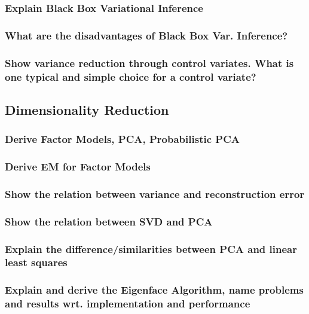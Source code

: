 \documentclass{article}
\begin{document}
\subsubsection{Explain Black Box Variational Inference}

\subsubsection{What are the disadvantages of Black Box Var. Inference?}

\subsubsection{Show variance reduction through control variates. What is one typical and simple choice for a control variate?}






\subsection{Dimensionality Reduction}

\subsubsection{Derive Factor Models, PCA, Probabilistic PCA}

\subsubsection{Derive EM for Factor Models}

\subsubsection{Show the relation between variance and reconstruction error}

\subsubsection{Show the relation between SVD and PCA}

\subsubsection{Explain the difference/similarities between PCA and linear least squares}

\subsubsection{Explain and derive the Eigenface Algorithm, name problems and results wrt. implementation and performance}
\end{document}
